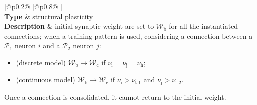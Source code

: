 \documentclass[a4paper, 12pt, twoside, openright]{book}
\newcommand{\popI}{\mathcal{P}_1}
\newcommand{\popII}{\mathcal{P}_2}
\newcommand{\rh}{\nu_\text{h}}
\newcommand{\rtI}{\nu_\text{t,1}}
\newcommand{\rtII}{\nu_\text{t,2}}
\newcommand{\Wb}{\mathcal{W}_\text{b}}
\newcommand{\Wc}{\mathcal{W}_\text{c}}
\def\marg{2pt}
\begin{document}
\begin{table}[H]
\begin{tabular}{
  |@{\hspace*{\marg}}p{}@{\hspace*{\marg}}
  |@{\hspace*{\marg}}p{}@{\hspace*{\marg}}
  |}
  \\
  \hline 
  \textbf{Type} & structural plasticity\\
  \hline 
  \textbf{Description} & initial synaptic weight are set to $\Wb$ for all the instantiated connections;
  when a training pattern is used, considering a connection between a $\popI$ neuron $i$ and a $\popII$ neuron $j$:
                         \begin{itemize}
                            \item (discrete model) $\Wb \rightarrow \Wc$ if $\nu_\text{i}=\nu_\text{j}=\rh$;
                            \item (continuous model) $\Wb \rightarrow \Wc$ if $\nu_\text{i}>\rtI$ and $\nu_\text{j}>\rtII$.
                         \end{itemize}
                        Once a connection is consolidated, it cannot return to the initial weight.
  \\
  \hline 
\end{tabular}

\caption{Description of the network model (continues on next page).}
\label{tab:model_description}
\end{table}
\addtocounter{table}{-1}
\end{document}
